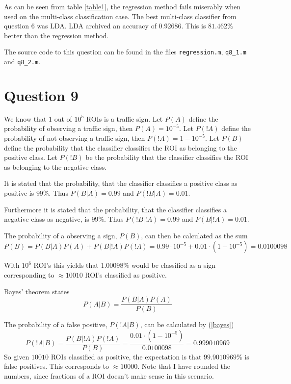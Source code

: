 \documentclass[10pt]{article}
\begin{document}
As can be seen from table \ref{table1}, the regression method fails miserably when used on the multi-class classification case. The best multi-class classifier from question 6 was LDA. LDA archived an accuracy of 0.92686. This is $81.462\%$ better than the regression method.
                                                                                                                    
The source code to this question can be found in the files \texttt{regression.m}, \texttt{q8\_1.m} and \texttt{q8\_2.m}. 


\section*{Question 9} %
\label{sec:question_9}

We know that $1$ out of $10^5$ ROIs is a traffic sign. Let $P(A)$ define the probability of observing a traffic sign, then $P(A) = 10^{-5}$. Let $P(!A)$ define the probability of not observing a traffic sign, then $P(!A) = 1-10^{-5}$. Let $P(B)$ define the probability that the classifier classifies the ROI as belonging to the positive class. Let $P(!B)$ be the probability that the classifier classifies the ROI as belonging to the negative class. 

It is stated that the probability, that the classifier classifies a positive class as positive is $99\%$\cite{assignment}. Thus $P(B|A)=0.99$ and $P(!B|A)=0.01$. 

Furthermore it is stated that the probability, that the classifier classifies a negative class as negative, is $99\%$\cite{assignment}. Thus $P(!B|!A) = 0.99$ and $P(B|!A) = 0.01$.

The probability of a observing a sign, $P(B)$, can then be calculated as the sum  
\begin{equation}
  P(B) = P(B|A)P(A)+P(B|!A)P(!A) = 0.99 \cdot 10^{-5} + 0.01 \cdot (1-10^{-5}) = 0.0100098
\end{equation} 

With $10^6$ ROI's this yields that $1.00098\%$ would be classified as a sign corresponding to $\approx 10010$ ROI's classified as positive. 

Bayes' theorem states
\begin{equation}
  P(A|B) = \frac{P(B | A) P(A)}{P(B)}
  \label{bayes}
\end{equation}

The probability of a false positive, $P(!A|B)$, can be calculated by (\ref{bayes}) 
\begin{equation}
P(!A|B) = \frac{P(B|!A)P(!A)}{P(B)} = \frac{0.01 \cdot (1-10^{-5})}{0.0100098} = 0.999010969    
\end{equation}
So given $10010$ ROIs classified as positive, the expectation is that $99.9010969\%$ is false positives. This corresponds to $\approx 10000$. Note that I have rounded the numbers, since fractions of a ROI doesn't make sense in this scenario.




\end{document}
